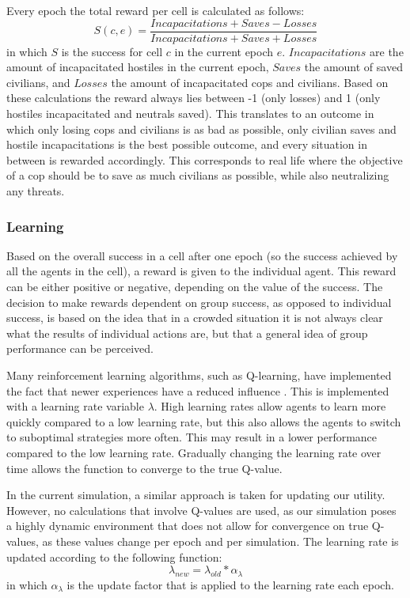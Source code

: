 Every epoch the total reward per cell is calculated as follows:
\begin{equation} \label{eq:reward}
S(c, e) = \frac{Incapacitations + Saves - Losses}{Incapacitations + Saves + Losses}
\end{equation}
in which $S$ is the success for cell $c$ in the current epoch $e$. $Incapacitations$ are the amount of incapacitated hostiles in the current epoch, $Saves$ the amount of saved civilians, and $Losses$ the amount of incapacitated cops and civilians.
Based on these calculations the reward always lies between -1 (only losses) and 1 (only hostiles incapacitated and neutrals saved).
This translates to an outcome in which only losing cops and civilians is as bad as possible,
only civilian saves and hostile incapacitations is the best possible outcome,
and every situation in between is rewarded accordingly.
This corresponds to real life where the objective of a cop should be to save as much civilians as possible, 
while also neutralizing any threats.

\subsubsection{Learning}
Based on the overall success in a cell after one epoch (so the success achieved by all the agents in the cell), a reward is given to the individual agent.
This reward can be either positive or negative, depending on the value of the success.
The decision to make rewards dependent on group success, as opposed to individual success, is based on the idea that in a crowded situation it is not always clear what the results of individual actions are, but that a general idea of group performance can be perceived.

Many reinforcement learning algorithms, such as Q-learning, have implemented the fact that newer experiences have a reduced influence  \citep*{watkins1992q}.
This is implemented with a learning rate variable $\lambda$.
High learning rates allow agents to learn more quickly compared to a low learning rate, but this also allows the agents to switch to suboptimal strategies more often.
This may result in a lower performance compared to the low learning rate.
Gradually changing the learning rate over time allows the function to converge to the true Q-value.

In the current simulation, a similar approach is taken for updating our utility.
However, no calculations that involve Q-values are used,
as our simulation poses a highly dynamic environment that does not allow for convergence on true Q-values,
as these values change per epoch and per simulation.
The learning rate is updated according to the following function:
\begin{equation} \label{eq:lambda}
\lambda_{new} = \lambda_{old} * \alpha_{\lambda}
\end{equation}
in which $\alpha_\lambda$ is the update factor that is applied to the learning rate each epoch.

